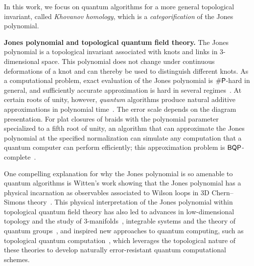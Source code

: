 \documentclass[a4paper,onecolumn,unpublished]{quantumarticle}
\theoremstyle{plain}
\theoremstyle{definition}
\theoremstyle{definition}
\numberwithin{equation}{section}
\begin{document}
In this work, we focus on quantum algorithms for a more general topological invariant, called \emph{Khovanov homology}, which is a \textit{categorification} of the Jones polynomial.  
\smallskip 

\noindent \textbf{Jones polynomial and topological quantum field theory.} 
The Jones polynomial \cite{jones1997polynomial} is a topological invariant associated with knots and links in 3-dimensional space.  This polynomial does not change under continuous deformations of a knot and can thereby be used to distinguish different knots. As a computational problem, exact evaluation of the Jones polynomial is $\#\mathsf{P}$-hard in general, and sufficiently accurate approximation is hard in several regimes~\cite{kuperberg2015hard}.  At certain roots of unity, however, \emph{quantum} algorithms produce natural additive approximations in polynomial time~\cite{Aharonov-Jones-Landau}.
The error scale depends on the diagram presentation. For plat closures of braids with the polynomial parameter specialized to a fifth root of unity, an algorithm that can approximate the Jones polynomial at the specified normalization can simulate any computation that a quantum computer can perform efficiently; this approximation problem is $\mathsf{BQP}$-complete~\cite{FreedmanLarsenWang2002,aharonov2011bqp}.   

One compelling explanation for why the Jones polynomial is so amenable to quantum algorithms is Witten's work showing that the Jones polynomial has a physical incarnation as observables associated to Wilson loops in 3D Chern--Simons theory~\cite{Witten-Jones}. This physical interpretation of the Jones polynomial within topological quantum field theory has also led to advances in low-dimensional topology and the study of 3-manifolds~\cite{MR1091619}, integrable systems and the theory of quantum groups~\cite{Kauff,Jones-stat}, and
inspired new approaches to quantum computing, such as topological quantum computation~\cite{FKLW,Kitaev}, which leverages the topological nature of these theories to develop naturally error-resistant quantum computational schemes.  
\smallskip 
\end{document}
